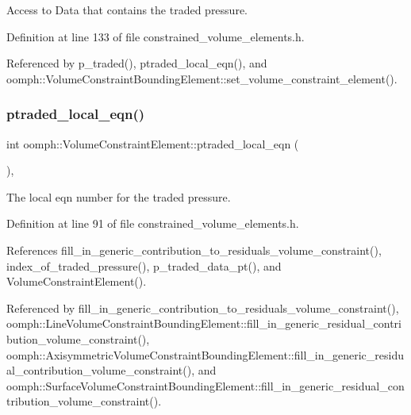 Access to Data that contains the traded pressure. 



Definition at line 133 of file constrained\+\_\+volume\+\_\+elements.\+h.



Referenced by p\+\_\+traded(), ptraded\+\_\+local\+\_\+eqn(), and oomph\+::\+Volume\+Constraint\+Bounding\+Element\+::set\+\_\+volume\+\_\+constraint\+\_\+element().

\mbox{\label{classoomph_1_1VolumeConstraintElement_ad0dedf705ccfb713848ad960bf1b901d}} 
\subsubsection{\texorpdfstring{ptraded\+\_\+local\+\_\+eqn()}{ptraded\_local\_eqn()}}
{\footnotesize\ttfamily int oomph\+::\+Volume\+Constraint\+Element\+::ptraded\+\_\+local\+\_\+eqn (\begin{DoxyParamCaption}{ }\end{DoxyParamCaption})\hspace{0.3cm}{\ttfamily [inline]}, {\ttfamily [private]}}



The local eqn number for the traded pressure. 



Definition at line 91 of file constrained\+\_\+volume\+\_\+elements.\+h.



References fill\+\_\+in\+\_\+generic\+\_\+contribution\+\_\+to\+\_\+residuals\+\_\+volume\+\_\+constraint(), index\+\_\+of\+\_\+traded\+\_\+pressure(), p\+\_\+traded\+\_\+data\+\_\+pt(), and Volume\+Constraint\+Element().



Referenced by fill\+\_\+in\+\_\+generic\+\_\+contribution\+\_\+to\+\_\+residuals\+\_\+volume\+\_\+constraint(), oomph\+::\+Line\+Volume\+Constraint\+Bounding\+Element\+::fill\+\_\+in\+\_\+generic\+\_\+residual\+\_\+contribution\+\_\+volume\+\_\+constraint(), oomph\+::\+Axisymmetric\+Volume\+Constraint\+Bounding\+Element\+::fill\+\_\+in\+\_\+generic\+\_\+residual\+\_\+contribution\+\_\+volume\+\_\+constraint(), and oomph\+::\+Surface\+Volume\+Constraint\+Bounding\+Element\+::fill\+\_\+in\+\_\+generic\+\_\+residual\+\_\+contribution\+\_\+volume\+\_\+constraint().



